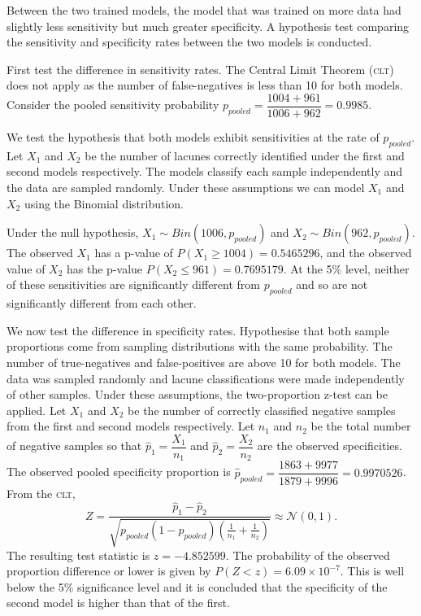 Between the two trained models, the model that was trained on more data had slightly less sensitivity but much greater specificity. A hypothesis test comparing the sensitivity and specificity rates between the two models is conducted.

First test the difference in sensitivity rates. The Central Limit Theorem (\textsc{clt}) does not apply as the number of false-negatives is less than 10 for both models. Consider the pooled sensitivity probability $p_{pooled} = \dfrac{1004+961}{1006+962} = 0.9985$.

We test the hypothesis that both models exhibit sensitivities at the rate of $p_{pooled}$. Let $X_1$ and $X_2$ be the number of lacunes correctly identified under the first and second models respectively. The models classify each sample independently and the data are sampled randomly. Under these assumptions we can model $X_1$ and $X_2$ using the Binomial distribution.

Under the null hypothesis, $X_1 \sim Bin(1006, p_{pooled})$ and $X_2 \sim Bin(962, p_{pooled})$. The observed $X_1$ has a p-value of $P(X_1 \geq 1004) = 0.5465296$, and the observed value of $X_2$ has the p-value $P(X_2 \leq 961) = 0.7695179$. At the 5\% level, neither of these sensitivities are significantly different from $p_{pooled}$ and so are not significantly different from each other.

We now test the difference in specificity rates. Hypothesise that both sample proportions come from sampling distributions with the same probability. The number of true-negatives and false-positives are above 10 for both models. The data was sampled randomly and lacune classifications were made independently of other samples. Under these assumptions, the two-proportion z-test can be applied. Let $X_1$ and $X_2$ be the number of correctly classified negative samples from the first and second models respectively. Let $n_1$ and $n_2$ be the total number of negative samples so that $\hat{p}_1 = \dfrac{X_1}{n_1}$ and $\hat{p}_2 = \dfrac{X_2}{n_2}$ are the observed specificities. The observed pooled specificity proportion is $\hat p_{pooled} = \dfrac{1863+9977}{1879+9996} = 0.9970526$. From the \textsc{clt},
\[
	Z = \dfrac{\hat{p}_1 - \hat{p}_2}{\sqrt{p_{pooled}(1 - p_{pooled})\left(\frac{1}{n_1} + \frac{1}{n_2}\right)}} \approx \mathcal{N}(0,1).
\]
The resulting test statistic is $z = -4.852599$. The probability of the observed proportion difference or lower is given by $P(Z < z) = 6.09\times10^{-7}$. This is well below the 5\% significance level and it is concluded that the specificity of the second model is higher than that of the first.

